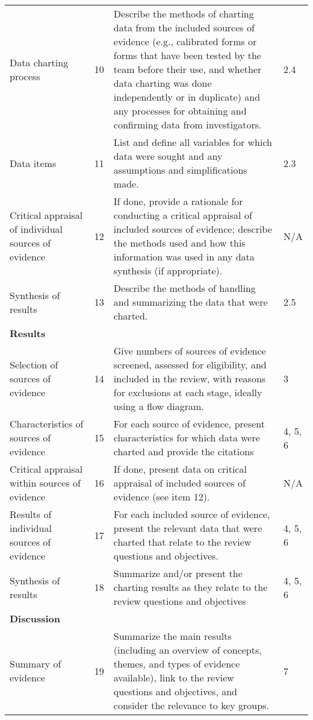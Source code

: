 \begin{longtable}{p{3cm} p{1cm} p{6cm} p{1.5cm}}
\addlinespace
Data charting process & 10 & Describe the methods of charting data from the included sources of evidence (e.g., calibrated forms or forms that have been tested by the team before their use, and whether data charting was done independently or in duplicate) and any processes for obtaining and confirming data from investigators. & 2.4 \\
\addlinespace
Data items & 11 & List and define all variables for which data were sought and any assumptions and simplifications made. & 2.3 \\
\addlinespace
Critical appraisal of individual sources of evidence & 12 & If done, provide a rationale for conducting a critical appraisal of included sources of evidence; describe the methods used and how this information was used in any data synthesis (if appropriate). & N/A \\
\addlinespace
Synthesis of results & 13 & Describe the methods of handling and summarizing the data that were charted. & 2.5 \\
\addlinespace
\hline
\addlinespace
\textbf{Results} &  &  & \\
\addlinespace
\hline
\addlinespace
Selection of sources of evidence & 14 & Give numbers of sources of evidence screened, assessed for eligibility, and included in the review, with reasons for exclusions at each stage, ideally using a flow diagram. & 3 \\
\addlinespace
Characteristics of sources of evidence & 15 & For each source of evidence, present characteristics for which data were charted and provide the citations & 4, 5, 6 \\
\addlinespace
Critical appraisal within sources of evidence & 16 & If done, present data on critical appraisal of included sources of evidence (see item 12). & N/A \\
\addlinespace
Results of individual sources of evidence & 17 & For each included source of evidence, present the relevant data that were charted that relate to the review questions and objectives. & 4, 5, 6 \\
\addlinespace
Synthesis of results & 18 & Summarize and/or present the charting results as they relate to the review questions and objectives & 4, 5, 6 \\
\addlinespace
\hline
\addlinespace
\textbf{Discussion} &  &  & \\
\addlinespace
\hline
\addlinespace
Summary of evidence & 19 & Summarize the main results (including an overview of concepts, themes, and types of evidence available), link to the review questions and objectives, and consider the relevance to key groups. & 7 \\

\end{longtable}
